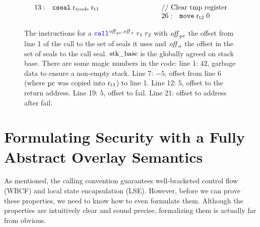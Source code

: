 \documentclass[acmsmall,screen]{acmart}\settopmatter{}
\renewcommand{\rretc}{\mathrm{r}_{\mathrm{rcode}}}
\begin{document}
\begin{figure}[htb]
{\[\begin{array}{r >{$}p{5.1cm}<{$} r l}
13:& \tcseal{\rretc}{\rtmp{1}}                                   &\multicolumn{2}{l}{\text{// Clear tmp register}}\\
      &    &26: & \tmove{\rtmp{2}}{0}\\
  \end{array}
\]
}
\caption{
  The instructions for a $\scall{\offpc,\offsigma}{r_1}{r_2}$ with $\mathit{off}_{\mathrm{pc}}$  the offset from line 1 of the call to the set of seals it uses and $\mathit{off}_\sigma$ the offset in the set of seals to the call seal.
  $\mathrm{stk\_base}$ is the globally agreed on stack base.
  There are some magic numbers in the code: line 1: $42$, garbage data to ensure a non-empty stack.
  Line 7: $-5$, offset from line 6 (where $\mathrm{pc}$ was copied into $\mathrm{r}_\mathrm{t1}$) to line 1.
  Line 12: $5$, offset to the return address.
  Line 19: $5$, offset to fail.
  Line 21: offset to address after fail.
}
  \label{fig:call-code}
\end{figure}



\section{Formulating Security with a Fully Abstract Overlay Semantics}
\label{sec:form-secur-with}
As mentioned, the \stktokens{} calling convention guarantees well-bracketed control flow (WBCF) and local state encapsulation (LSE).
However, before we can prove these properties, we need to know how to even formulate them.
Although the properties are intuitively clear and sound precise, formalizing them is actually far from obvious.
\end{document}
